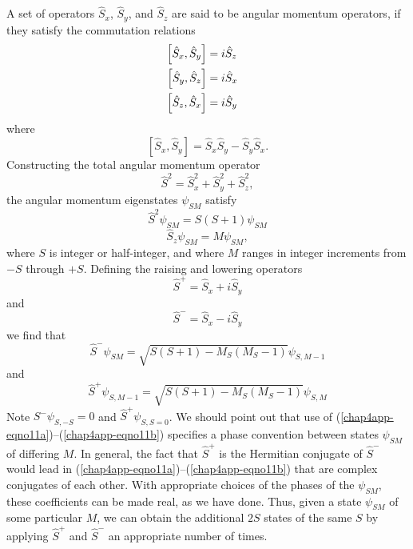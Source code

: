 {A set of operators  ${\hat S}_x$, ${\hat S}_y$, and ${\hat S}_z$ are 
said to be angular momentum operators, if they satisfy the commutation relations
\begin{eqnarray}
\left[ {\hat S}_x , {\hat S}_y \right] &= i {\hat S}_z\cr
\left[ {\hat S}_y , {\hat S}_z \right] &= i {\hat S}_x\cr
\left[ {\hat S}_z , {\hat S}_x \right] &= i {\hat S}_y\cr
%
\label{chap4app-eqno6}
\end{eqnarray}
where
\begin{equation}
\left[ {\hat S}_x , {\hat S}_y \right] = {\hat S}_x
{\hat S}_y - {\hat S}_y {\hat S}_x .
\end{equation}
Constructing the total angular momentum operator
\begin{equation}
{\hat S}^2 = {\hat S}^2_x + {\hat S}^2_y + {\hat S}^2_z ,
\label{chap4app-eqno7}
\end{equation}
the angular momentum eigenstates $\psi_{SM}$ satisfy
\begin{equation}
{\hat S}^2 \psi_{SM} = S ( S + 1 ) \psi_{SM}
\label{chap4app-eqno8}
\end{equation}
\begin{equation}
{\hat S}_z \psi_{SM} = M \psi_{SM} ,
\label{chap4app-eqno9}
\end{equation}
where $S$ is integer or half-integer, and where $M$ ranges in integer 
increments from $-S$ through $+S$.  Defining the raising and lowering 
operators
\begin{equation}
{\hat S}^+ = {\hat S}_x + i {\hat S}_y
\label{chap4app-eqno10a}
\end{equation}
and
\begin{equation}
{\hat S}^- = {\hat S}_x - i {\hat S}_y
\label{chap4app-eqno10b}
\end{equation}
we find that
\begin{equation}
{\hat S}^- \psi_{SM} = \sqrt{S(S+1) - M_S(M_S - 1)} 
\psi_{S,M-1}
\label{chap4app-eqno11a}
\end{equation}
and
\begin{equation}
{\hat S}^+ \psi_{S,M-1} = \sqrt{S(S+1) - M_S(M_S - 1)} 
\psi_{S,M}
\label{chap4app-eqno11b}
\end{equation}
Note $S^-\psi_{S,-S} = 0$ and ${\hat S}^+ \psi_{S,S=0}$.  We should
point out that use of
(\ref{chap4app-eqno11a})--(\ref{chap4app-eqno11b}) specifies a phase
convention between states $\psi_{SM}$ of differing $M$.  In general,
the fact that ${\hat S}^+$ is the Hermitian conjugate of ${\hat S}^-$
would lead in (\ref{chap4app-eqno11a})--(\ref{chap4app-eqno11b}) that
are complex conjugates of each other.  With appropriate choices of the
phases of the $\psi_{SM}$, these coefficients can be made real, as we
have done.  Thus, given a state $\psi_{SM}$ of some particular $M$, we
can obtain the additional $2S$ states of the same $S$ by applying
${\hat S}^+$ and ${\hat S}^-$ an appropriate number of times.

}
